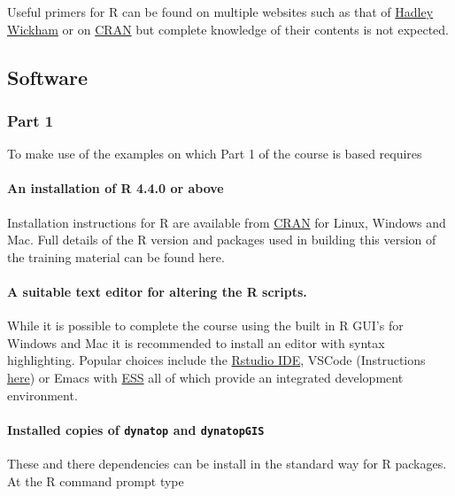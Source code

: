 \documentclass[]{article}
\begin{document}
Useful primers for R can be found on multiple websites such as that of
\href{https://adv-r.hadley.nz/}{Hadley Wickham} or on
\href{https://cran.r-project.org/doc/manuals/r-release/R-intro.pdf}{CRAN} but
complete knowledge of their contents is not expected.

\subsection{Software}

\subsubsection{Part 1}

To make use of the examples on which Part 1 of the course is based requires

\paragraph{An installation of R 4.4.0 or above}

Installation instructions for R are available from
\href{https://cran.r-project.org/}{CRAN} for Linux, Windows and Mac.
Full details of the R version and packages used in building this version of
the training material can be found {here}.

\paragraph{A suitable text editor for altering the R scripts.}

While it is possible to complete the course using the built in R GUI's for
Windows and Mac it is recommended to install an editor with syntax
highlighting. Popular choices include the \href{https://www.rstudio.com/products/rstudio/download/\#download}{Rstudio
IDE}, VSCode
(Instructions
\href{https://www.r-bloggers.com/2021/01/setup-visual-studio-code-to-run-r-on-vscode-2021/}{here})
or Emacs with \href{https://ess.r-project.org/index.php?Section=home}{ESS} all of
which provide an integrated development environment.

\paragraph{Installed copies of \texttt{dynatop} and \texttt{dynatopGIS}}

These and there dependencies can be install in the standard way for R packages. At the R command
prompt type
\end{document}
